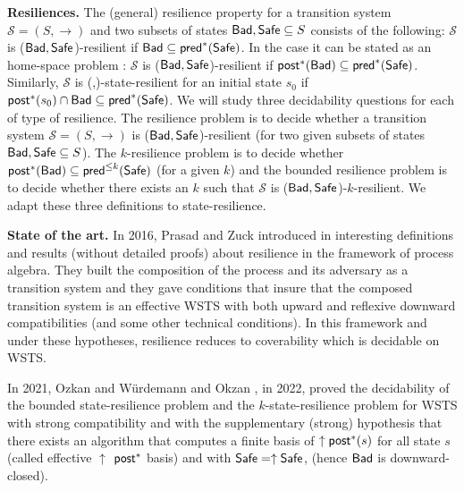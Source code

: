 {\bf Resiliences.}  
The (general) resilience property for a transition system $\mathscr{S} = (S,\rightarrow )$ and two subsets of states $\textsf{Bad},\textsf{Safe} \subseteq S$ consists of the following: $\mathscr{S}$ is ($\textsf{Bad},\textsf{Safe}$)-resilient if
$\textsf{Bad} \subseteq \textsf{pred}^*(\textsf{Safe})$. In the case 
it 
can be stated as an home-space problem : $\mathscr{S}$ is ($\textsf{Bad},\textsf{Safe}$)-resilient if $\textsf{post}^*(\textsf{Bad}) \subseteq \textsf{pred}^*(\textsf{Safe})$.
Similarly, $\mathscr{S}$ is (\Bad,\Safe)-state-resilient for an initial state $s_0$ if  
$\textsf{post}^*(s_0) \cap \textsf{Bad} \subseteq \textsf{pred}^*(\textsf{Safe})$.
We will study three decidability questions for each of type of resilience.
The resilience problem is to decide whether a transition system $\mathscr{S} = (S,\rightarrow )$ is ($\textsf{Bad},\textsf{Safe}$)-resilient (for two given subsets of states $\textsf{Bad},\textsf{Safe} \subseteq S$).
The $k$-resilience problem is to decide whether $\textsf{post}^*(\textsf{Bad}) \subseteq \textsf{pred}^{\leq k}(\textsf{Safe})$ (for a given $k$) and 
the bounded resilience problem is to decide whether there exists an $k$ such that $\mathscr{S}$ is ($\textsf{Bad},\textsf{Safe}$)-$k$-resilient. We adapt these three definitions to state-resilience.


{\bf State of the art.}
In 2016, Prasad and Zuck introduced in  \cite{DBLP:journals/corr/PrasadZ16} interesting definitions and results (without detailed proofs) about resilience in the framework of process algebra. They built the composition of the process and its adversary as a transition system and they gave conditions that insure that the composed transition system is an effective WSTS with both upward and reflexive downward compatibilities (and some other technical conditions). In this framework and under these hypotheses, resilience reduces to coverability which is decidable on WSTS. 

In 2021, Ozkan and Würdemann  \cite{DBLP:journals/corr/abs-2108-00889} and Okzan \cite{DBLP:conf/gg/Ozkan22}, in 2022, proved the decidability of the bounded state-resilience problem and the $k$-state-resilience problem for WSTS  with strong compatibility and with the supplementary (strong) hypothesis that there exists an algorithm that computes a finite basis of $\uparrow \textsf{post}^*(s)$ for all state $s$ (called effective 
$\uparrow$ $\textsf{post}^*$ basis) and with $\textsf{Safe}=\uparrow \textsf{Safe}$, (hence $\textsf{Bad}$ is downward-closed).


